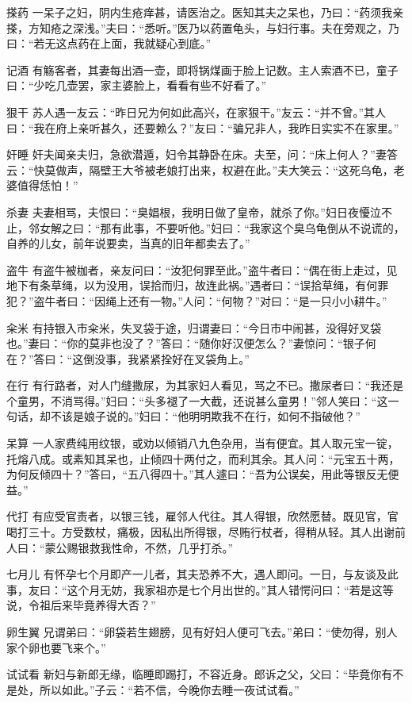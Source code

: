 \documentclass[12pt,UTF8]{ctexbook}
\begin{document}
搽药
一呆子之妇，阴内生疮痒甚，请医治之。医知其夫之呆也，乃曰：“药须我亲搽，方知疮之深浅。”夫曰：“悉听。”医乃以药置龟头，与妇行事。夫在旁观之，乃曰：“若无这点药在上面，我就疑心到底。”

记酒
有觞客者，其妻每出酒一壶，即将锅煤画于脸上记数。主人索酒不已，童子曰：“少吃几壶罢，家主婆脸上，看看有些不好看了。”

狠干
苏人遇一友云：“昨日兄为何如此高兴，在家狠干。”友云：“并不曾。”其人曰：“我在府上亲听甚久，还要赖么？”友曰：“骗兄非人，我昨日实实不在家里。”

奸睡
奸夫闻亲夫归，急欲潜遁，妇令其静卧在床。夫至，问：“床上何人？”妻答云：“快莫做声，隔壁王大爷被老娘打出来，权避在此。”夫大笑云：“这死乌龟，老婆值得恁怕！”

杀妻
夫妻相骂，夫恨曰：“臭娼根，我明日做了皇帝，就杀了你。”妇日夜懮泣不止，邻女解之曰：“那有此事，不要听他。”妇曰：“我家这个臭乌龟倒从不说谎的，自养的儿女，前年说要卖，当真的旧年都卖去了。”

盗牛
有盗牛被枷者，亲友问曰：“汝犯何罪至此。”盗牛者曰：“偶在街上走过，见地下有条草绳，以为没用，误拾而归，故连此祸。”遇者曰：“误拾草绳，有何罪犯？”盗牛者曰：“因绳上还有一物。”人问：“何物？”对曰：“是一只小小耕牛。”

籴米
有持银入市籴米，失叉袋于途，归谓妻曰：“今日市中闹甚，没得好叉袋也。”妻曰：“你的莫非也没了？”答曰：“随你好汉便怎么？”妻惊问：“银子何在？”答曰：“这倒没事，我紧紧拴好在叉袋角上。”

在行
有行路者，对人门缝撒尿，为其家妇人看见，骂之不已。撒尿者曰：“我还是个童男，不消骂得。”妇曰：“头多褪了一大截，还说甚么童男！”邻人笑曰：“这一句话，却不该是娘子说的。”妇曰：“他明明欺我不在行，如何不指破他？”

呆算
一人家费纯用纹银，或劝以倾销八九色杂用，当有便宜。其人取元宝一锭，托熔八成。或素知其呆也，止倾四十两付之，而利其余。其人问：“元宝五十两，为何反倾四十？”答曰，“五八得四十。”其人遽曰：“吾为公误矣，用此等银反无便益。”

代打
有应受官责者，以银三钱，雇邻人代往。其人得银，欣然愿替。既见官，官喝打三十。方受数杖，痛极，因私出所得银，尽贿行杖者，得稍从轻。其人出谢前人曰：“蒙公赐银救我性命，不然，几乎打杀。”

七月儿
有怀孕七个月即产一儿者，其夫恐养不大，遇人即问。一日，与友谈及此事，友曰：“这个月无妨，我家祖亦是七个月出世的。”其人错愕问曰：“若是这等说，令祖后来毕竟养得大否？”

卵生翼
兄谓弟曰：“卵袋若生翅膀，见有好妇人便可飞去。”弟曰：“使勿得，别人家个卵也要飞来个。”

试试看
新妇与新郎无缘，临睡即踢打，不容近身。郎诉之父，父曰：“毕竟你有不是处，所以如此。”子云：“若不信，今晚你去睡一夜试试看。”
\end{document}
